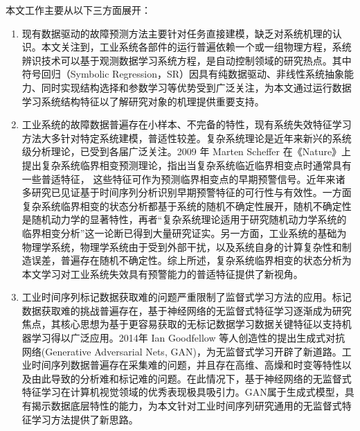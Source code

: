 本文工作主要从以下三方面展开：
\begin{enumerate}[1.]
	\item 现有数据驱动的故障预测方法主要针对任务直接建模，缺乏对系统机理的认识\cite{tsui2015prognostics,si2011remaining}。本文关注到，工业系统各部件的运行普遍依赖一个或一组物理方程，系统辨识技术可以基于观测数据学习系统方程，是自动控制领域的研究热点\cite{bongard2007automated}。其中符号回归（Symbolic Regression，SR）因具有纯数据驱动、非线性系统抽象能力、同时实现结构选择和参数学习等优势受到广泛关注\cite{koza1994genetic}，为本文通过运行数据学习系统结构特征以了解研究对象的机理提供重要支持。
	\item 工业系统的故障数据普遍存在小样本、不完备的特性，现有系统失效特征学习方法大多针对特定系统建模，普适性较差\cite{pecht2010prognostics}。复杂系统理论是近年来新兴的系统级分析理论，已受到各届广泛关注\cite{auyang1999foundations}。2009 年 Marten Scheffer 在《Nature》上提出复杂系统临界相变预测理论，指出当复杂系统临近临界相变点时通常具有一些普适特征， 这些特征可作为预测临界相变点的早期预警信号\cite{scheffer2009early}。近年来诸多研究已见证基于时间序列分析识别早期预警特征的可行性与有效性\cite{scheffer2009early,wang2012flickering,boettiger2012quantifying}。一方面复杂系统临界相变的状态分析都基于系统的随机不确定性展开，随机不确定性是随机动力学的显著特性\cite{scheffer2001catastrophic}，再者“复杂系统理论适用于研究随机动力学系统的临界相变分析”这一论断已得到大量研究证实\cite{van2007slow,longtin2010stochastic,carpenter2011early}。另一方面，工业系统的基础为物理学系统\cite{lee2015cyber}，物理学系统由于受到外部干扰，以及系统自身的计算复杂性和制造误差，普遍存在随机不确定性\cite{wolfram1985origins}。综上所述，复杂系统临界相变的状态分析为本文学习对工业系统失效具有预警能力的普适特征提供了新视角。
	\item 工业时间序列标记数据获取难的问题严重限制了监督式学习方法的应用\cite{langkvist2014review}。标记数据获取难的挑战普遍存在，基于神经网络的无监督式特征学习逐渐成为研究焦点，其核心思想为基于更容易获取的无标记数据学习数据关键特征以支持机器学习得以广泛应用\cite{lecun2015deep}。2014年 Ian Goodfellow 等人创造性的提出生成式对抗网络(Generative Adversarial Nets, GAN)\cite{goodfellow2014generative}，为无监督式学习开辟了新道路。工业时间序列数据普遍存在采集难的问题，并且存在高维、高燥和时变等特性以及由此导致的分析难和标记难的问题。在此情况下，基于神经网络的无监督式特征学习在计算机视觉领域的优秀表现极具吸引力。GAN属于生成式模型，具有揭示数据底层特性的能力，为本文针对工业时间序列研究通用的无监督式特征学习方法提供了新思路。
\end{enumerate}

